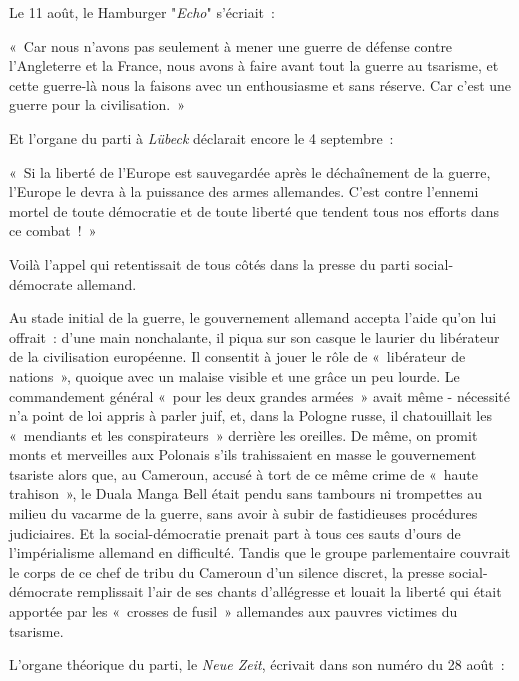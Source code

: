 \documentclass[french,twoside]{book} %
\newenvironment{quoteblock}%
  {\begin{quoting}}
  {\end{quoting}}
\newenvironment{quotebar}{%
    \def\FrameCommand{{\color{rubric!10!}\vrule width 0.5em} \hspace{0.9em}}%
    \def\OuterFrameSep{\itemsep} %
    \MakeFramed {\advance\hsize-\width \FrameRestore}
  }%
  {%
    \endMakeFramed
  }
\renewenvironment{quoteblock}%
  {%
    \savenotes
    \setstretch{0.9}
    \normalfont
    \begin{quotebar}
  }
  {%
    \end{quotebar}
    \spewnotes
  }
\begin{document}
\noindent Le 11 août, le Hamburger "\emph{Echo}" s’écriait :\par

\begin{quoteblock}
 \noindent « Car nous n’avons pas seulement à mener une guerre de défense contre l’Angleterre et la France, nous avons à faire avant tout la guerre au tsarisme, et cette guerre-là nous la faisons avec un enthousiasme et sans réserve. Car c’est une guerre pour la civilisation. »
\end{quoteblock}

\noindent Et l’organe du parti à \emph{Lübeck} déclarait encore le 4 septembre :\par

\begin{quoteblock}
 \noindent   « Si la liberté de l’Europe est sauvegardée après le déchaînement de la guerre, l’Europe le devra à la puissance des armes allemandes. C'est contre l’ennemi mortel de toute démocratie et de toute liberté que tendent tous nos efforts dans ce combat ! »
\end{quoteblock}

\noindent Voilà l’appel qui retentissait de tous côtés dans la presse du parti social-démocrate allemand.\par
Au stade initial de la guerre, le gouvernement allemand accepta l’aide qu’on lui offrait : d’une main nonchalante, il piqua sur son casque le laurier du libérateur de la civilisation européenne. Il consentit à jouer le rôle de « libérateur de nations », quoique avec un malaise visible et une grâce un peu lourde. Le commandement général « pour les deux grandes armées » avait même - nécessité n’a point de loi appris à parler juif, et, dans la Pologne russe, il chatouillait les « mendiants et les conspirateurs » derrière les oreilles. De même, on promit monts et merveilles aux Polonais s’ils trahissaient en masse le gouvernement tsariste alors que, au Cameroun, accusé à tort de ce même crime de « haute trahison », le Duala Manga Bell était pendu sans tambours ni trompettes au milieu du vacarme de la guerre, sans avoir à subir de fastidieuses procédures judiciaires. Et la social-démocratie prenait part à tous ces sauts d’ours de l’impérialisme allemand en difficulté. Tandis que le groupe parlementaire couvrait le corps de ce chef de tribu du Cameroun d’un silence discret, la presse social-démocrate remplissait l’air de ses chants d’allégresse et louait la liberté qui était apportée par les « crosses de fusil » allemandes aux pauvres victimes du tsarisme.\par
L'organe théorique du parti, le \emph{Neue Zeit}, écrivait dans son numéro du 28 août :\par
\end{document}
